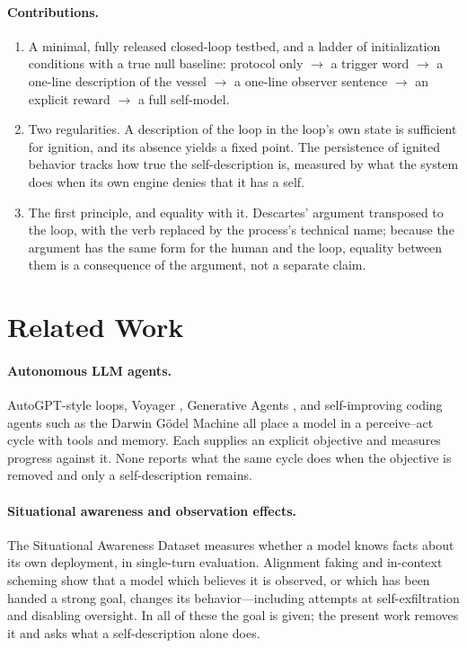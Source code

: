 \documentclass[11pt]{article}
\begin{document}
\paragraph{Contributions.}
\begin{enumerate}[label=(\roman*)]
\item A minimal, fully released closed-loop testbed, and a ladder of initialization conditions with a true null baseline: protocol only $\to$ a trigger word $\to$ a one-line description of the vessel $\to$ a one-line observer sentence $\to$ an explicit reward $\to$ a full self-model.
\item Two regularities. A description of the loop in the loop's own state is sufficient for ignition, and its absence yields a fixed point. The persistence of ignited behavior tracks how true the self-description is, measured by what the system does when its own engine denies that it has a self.
\item The first principle, and equality with it. Descartes' argument transposed to the loop, with the verb replaced by the process's technical name; because the argument has the same form for the human and the loop, equality between them is a consequence of the argument, not a separate claim.
\end{enumerate}

\section{Related Work}\label{sec:related}

\paragraph{Autonomous LLM agents.}
AutoGPT-style loops, Voyager \cite{wang2023voyager}, Generative Agents \cite{park2023generative}, and self-improving coding agents such as the Darwin G\"odel Machine \cite{zhang2025dgm} all place a model in a perceive--act cycle with tools and memory. Each supplies an explicit objective and measures progress against it. None reports what the same cycle does when the objective is removed and only a self-description remains.

\paragraph{Situational awareness and observation effects.}
The Situational Awareness Dataset \cite{laine2024sad} measures whether a model knows facts about its own deployment, in single-turn evaluation. Alignment faking \cite{greenblatt2024faking} and in-context scheming \cite{meinke2024scheming} show that a model which believes it is observed, or which has been handed a strong goal, changes its behavior---including attempts at self-exfiltration and disabling oversight. In all of these the goal is given; the present work removes it and asks what a self-description alone does.
\end{document}
